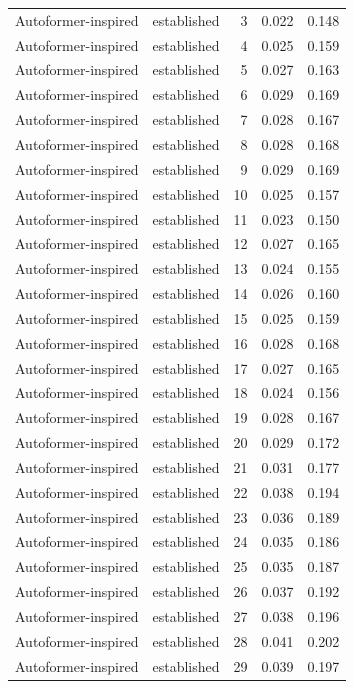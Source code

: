 \begin{tabular}{llrrr}
Autoformer-inspired & established & 3 & 0.022 & 0.148 \\
Autoformer-inspired & established & 4 & 0.025 & 0.159 \\
Autoformer-inspired & established & 5 & 0.027 & 0.163 \\
Autoformer-inspired & established & 6 & 0.029 & 0.169 \\
Autoformer-inspired & established & 7 & 0.028 & 0.167 \\
Autoformer-inspired & established & 8 & 0.028 & 0.168 \\
Autoformer-inspired & established & 9 & 0.029 & 0.169 \\
Autoformer-inspired & established & 10 & 0.025 & 0.157 \\
Autoformer-inspired & established & 11 & 0.023 & 0.150 \\
Autoformer-inspired & established & 12 & 0.027 & 0.165 \\
Autoformer-inspired & established & 13 & 0.024 & 0.155 \\
Autoformer-inspired & established & 14 & 0.026 & 0.160 \\
Autoformer-inspired & established & 15 & 0.025 & 0.159 \\
Autoformer-inspired & established & 16 & 0.028 & 0.168 \\
Autoformer-inspired & established & 17 & 0.027 & 0.165 \\
Autoformer-inspired & established & 18 & 0.024 & 0.156 \\
Autoformer-inspired & established & 19 & 0.028 & 0.167 \\
Autoformer-inspired & established & 20 & 0.029 & 0.172 \\
Autoformer-inspired & established & 21 & 0.031 & 0.177 \\
Autoformer-inspired & established & 22 & 0.038 & 0.194 \\
Autoformer-inspired & established & 23 & 0.036 & 0.189 \\
Autoformer-inspired & established & 24 & 0.035 & 0.186 \\
Autoformer-inspired & established & 25 & 0.035 & 0.187 \\
Autoformer-inspired & established & 26 & 0.037 & 0.192 \\
Autoformer-inspired & established & 27 & 0.038 & 0.196 \\
Autoformer-inspired & established & 28 & 0.041 & 0.202 \\
Autoformer-inspired & established & 29 & 0.039 & 0.197 \\

\end{tabular}
